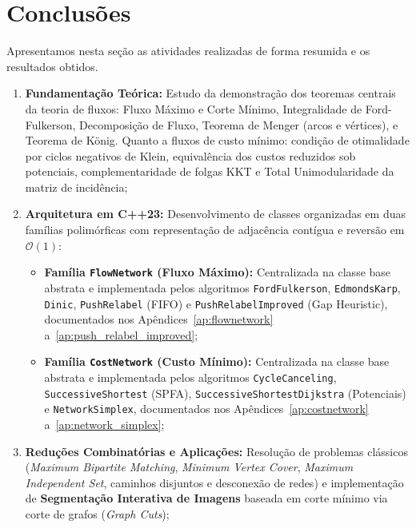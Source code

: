 \section{Conclusões}\label{sec:conclusoes}

Apresentamos nesta seção as atividades realizadas de forma resumida e os resultados obtidos.

\begin{enumerate}[leftmargin=1.5em, itemsep=0.2em, topsep=0.2em, parsep=0em]
    \item \textbf{Fundamentação Teórica:} Estudo da demonstração dos teoremas centrais da teoria de fluxos: Fluxo Máximo e Corte Mínimo, Integralidade de Ford-Fulkerson, Decomposição de Fluxo, Teorema de Menger (arcos e vértices), e Teorema de König. Quanto a fluxos de custo mínimo: condição de otimalidade por ciclos negativos de Klein, equivalência dos custos reduzidos sob potenciais, complementaridade de folgas KKT e Total Unimodularidade da matriz de incidência;

    \item \textbf{Arquitetura em C++23:} Desenvolvimento de classes organizadas em duas famílias polimórficas com representação de adjacência contígua e reversão em $\mathcal{O}(1)$:
    \begin{itemize}[leftmargin=1.5em, itemsep=0.1em, topsep=0.1em, parsep=0em]
    \raggedright
        \item \textbf{Família \lstinline{FlowNetwork} (Fluxo Máximo):} Centralizada na classe base abstrata e implementada pelos algoritmos \lstinline{FordFulkerson}, \lstinline{EdmondsKarp}, \lstinline{Dinic}, \lstinline{PushRelabel} (FIFO) e \lstinline{PushRelabelImproved} (Gap Heuristic), documentados nos Apêndices~\ref{ap:flownetwork} a~\ref{ap:push_relabel_improved};
        \item \textbf{Família \lstinline{CostNetwork} (Custo Mínimo):} Centralizada na classe base abstrata e implementada pelos algoritmos \lstinline{CycleCanceling}, \lstinline{SuccessiveShortest} (SPFA), \lstinline{SuccessiveShortestDijkstra} (Potenciais) e \lstinline{NetworkSimplex}, documentados nos Apêndices~\ref{ap:costnetwork} a~\ref{ap:network_simplex};
    \end{itemize}

    \item \textbf{Reduções Combinatórias e Aplicações:} Resolução de problemas clássicos (\textit{Maximum Bipartite Matching}, \textit{Minimum Vertex Cover}, \textit{Maximum Independent Set}, caminhos disjuntos e desconexão de redes) e implementação de \textbf{Segmentação Interativa de Imagens} baseada em corte mínimo via corte de grafos (\textit{Graph Cuts});


\end{enumerate}
